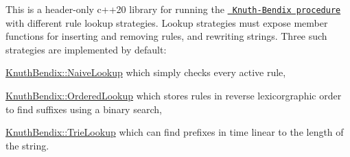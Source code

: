 This is a header-\/only c++20 library for running the \href{https://en.wikipedia.org/wiki/Knuth\%E2\%80\%93Bendix_completion_algorithm}{\texttt{ Knuth-\/\+Bendix procedure}} with different rule lookup strategies. Lookup strategies must expose member functions for inserting and removing rules, and rewriting strings. Three such strategies are implemented by default\+:
\begin{DoxyItemize}
\item \mbox{\hyperlink{structKnuthBendix_1_1NaiveLookup}{Knuth\+Bendix\+::\+Naive\+Lookup}} which simply checks every active rule,
\item \mbox{\hyperlink{structKnuthBendix_1_1OrderedLookup}{Knuth\+Bendix\+::\+Ordered\+Lookup}} which stores rules in reverse lexicorgraphic order to find suffixes using a binary search,
\item \mbox{\hyperlink{structKnuthBendix_1_1TrieLookup}{Knuth\+Bendix\+::\+Trie\+Lookup}} which can find prefixes in time linear to the length of the string.
\end{DoxyItemize}


\begin{DoxyCode}{0}
\DoxyCodeLine{\};}
\DoxyCodeLine{}

\end{DoxyCode}
 